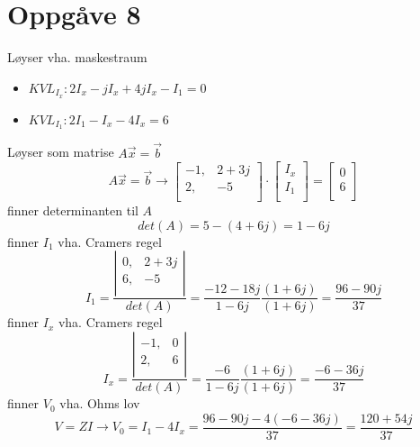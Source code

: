 \documentclass[12pt,a4paper]{article}
\begin{document}
  \newpage

  \section*{Oppgåve 8}
    Løyser vha. maskestraum
    \begin{itemize}
      \item $KVL_{I_x}: 2I_x -jI_x +4jI_x -I_1 = 0$
      \item $KVL_{I_1}: 2I_1 -I_x -4I_x = 6$
    \end{itemize}
    Løyser som matrise $A\vec{x} = \vec{b}$
    \begin{equation}
      A\vec{x} = \vec{b} \rightarrow
      \left[ \begin{array}{cc}
        -1, & 2+3j \\
        2,  & -5 \\
      \end{array} \right]
      \cdot
      \left[ \begin{array}{c}
        I_x \\
        I_1 \\
      \end{array} \right]
      =
      \left[ \begin{array}{c}
        0 \\
        6 \\
      \end{array} \right]
    \end{equation}
    finner determinanten til $A$
    \begin{equation}
      det(A) = 5-(4+6j) = 1 - 6j
    \end{equation}
    finner $I_1$ vha. Cramers regel
    \begin{equation}
      I_1 = \frac{
        \left| \begin{array}{cc}
          0, & 2+3j \\
          6, & -5 \\
        \end{array} \right|}
      {det(A)} =
      \frac{-12-18j}{1-6j}\frac{(1+6j)}{(1+6j)} =
      \frac{96-90j}{37}
    \end{equation}
    finner $I_x$ vha. Cramers regel
    \begin{equation}
      I_x = \frac{
        \left| \begin{array}{cc}
          -1, & 0 \\
          2,  & 6 \\
        \end{array} \right|}
      {det(A)} =
      \frac{-6}{1-6j}\frac{(1+6j)}{(1+6j)} =
      \frac{-6-36j}{37}
    \end{equation}
    finner $V_0$ vha. Ohms lov
    \begin{equation}
      V=ZI\rightarrow V_0=I_1-4I_x = \frac{96-90j-4(-6-36j)}{37} = \frac{120+54j}{37}
    \end{equation}
\end{document}
